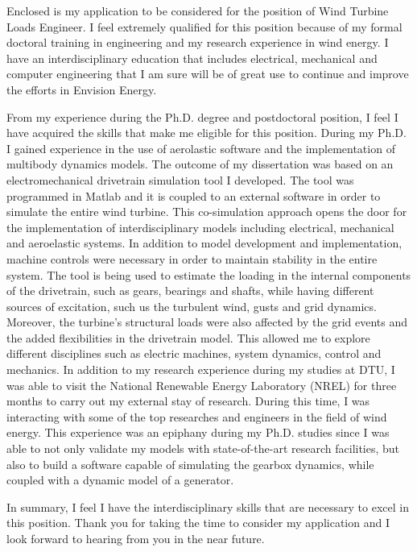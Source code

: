 \documentclass[10pt,stdletter,dateno,sigleft]{newlfm} %
\begin{document}
\begin{newlfm}


Enclosed is my application to be considered for the position of Wind Turbine Loads Engineer. I feel extremely qualified for this position because of my formal doctoral training in engineering and my research experience in wind energy. I have an interdisciplinary education that includes electrical, mechanical and computer engineering that I am sure will be of great use to continue and improve the efforts in Envision Energy.

From my experience during the Ph.D. degree and postdoctoral position, I feel I have acquired the skills that make me eligible for this position. During my Ph.D. I gained experience in the use of aerolastic software and the implementation of multibody dynamics models. The outcome of my dissertation was based on an electromechanical drivetrain simulation tool I developed. The tool was programmed in Matlab and it is coupled to an external software in order to simulate the entire wind turbine. This co-simulation approach opens the door for the implementation of interdisciplinary models including electrical, mechanical and aeroelastic systems. In addition to model development and implementation, machine controls were necessary in order to maintain stability in the entire system. The tool is being used to estimate the loading in the internal components of the drivetrain, such as gears, bearings and shafts, while having different sources of excitation, such us the turbulent wind, gusts and grid dynamics. Moreover, the turbine's structural loads were also affected by the grid events and the added flexibilities in the drivetrain model. This allowed me to explore different disciplines such as electric machines, system dynamics, control and mechanics. In addition to my research experience during my studies at DTU, I was able to visit the National Renewable Energy Laboratory (NREL) for three months to carry out my external stay of research. During this time, I was interacting with some of the top researches and engineers in the field of wind energy. This experience was an epiphany during my Ph.D. studies since I was able to not only validate my models with state-of-the-art research facilities, but also to build a software capable of simulating the gearbox dynamics, while coupled with a dynamic model of a generator.

In summary, I feel I have the interdisciplinary skills that are necessary to excel in this position. Thank you for taking the time to consider my application and I look forward to hearing from you in the near future.


\end{newlfm}
\end{document}
